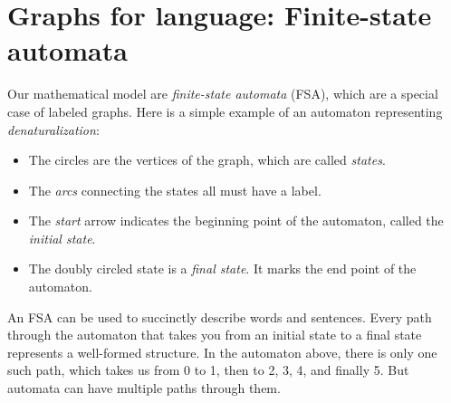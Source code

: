 \section{Graphs for language: Finite-state automata}

Our mathematical model are \emph{finite-state automata} (FSA), which are a special case of labeled graphs.
Here is a simple example of an automaton representing \emph{denaturalization}:
%
\begin{center}
\end{center}
%
\begin{itemize}
    \item The circles are the vertices of the graph, which are called \emph{states}.
    \item The \emph{arcs} connecting the states all must have a label.
    \item The \emph{start} arrow indicates the beginning point of the automaton, called the \emph{initial state}.
    \item The doubly circled state is a \emph{final state}.
        It marks the end point of the automaton.
\end{itemize}

An FSA can be used to succinctly describe words and sentences.
Every path through the automaton that takes you from an initial state to a final state represents a well-formed structure.
In the automaton above, there is only one such path, which takes us from 0 to 1, then to 2, 3, 4, and finally 5.
But automata can have multiple paths through them.

